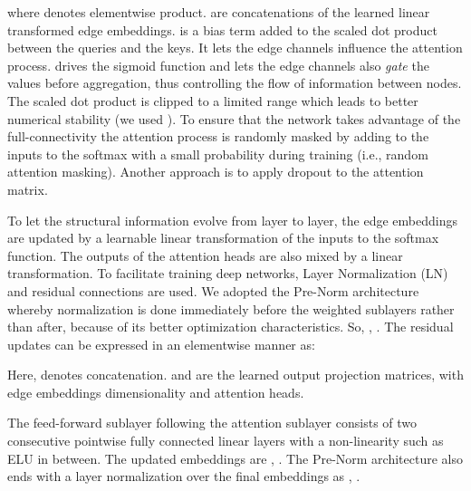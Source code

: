 \documentclass[sigconf,authorversion]{acmart}
\begin{document}
where  denotes elementwise product.  are concatenations of the learned linear transformed edge embeddings.  is a bias term added to the scaled dot product between the queries and the keys. It lets the edge channels influence the attention process.  drives the sigmoid  function and lets the edge channels also \emph{gate} the values before aggregation, thus controlling the flow of information between nodes. The scaled dot product is clipped to a limited range which leads to better numerical stability (we used ). To ensure that the network takes advantage of the full-connectivity the attention process is randomly masked by adding  to the inputs to the softmax with a small probability during training (i.e., random attention masking). Another approach is to apply dropout \cite{srivastava2014dropout} to the attention matrix.

To let the structural information evolve from layer to layer, the edge embeddings are updated by a learnable linear transformation of the inputs to the softmax function. The outputs of the attention heads are also mixed by a linear transformation. To facilitate training deep networks, Layer Normalization (LN) \citep{ba2016layer} and residual connections \citep{he2016deep} are used. We adopted the Pre-Norm architecture whereby normalization is done immediately before the weighted sublayers \citep{xiong2020layer} rather than after, because of its better optimization characteristics. So, , . The residual updates can be expressed in an elementwise manner as:

Here,  denotes concatenation.  and  are the learned output projection matrices, with edge embeddings dimensionality  and  attention heads.

The feed-forward sublayer following the attention sublayer consists of two consecutive pointwise fully connected linear layers with a non-linearity such as ELU \citep{clevert2015fast} in between. The updated embeddings are , . The Pre-Norm architecture also ends with a layer normalization over the final embeddings as , .
\end{document}
